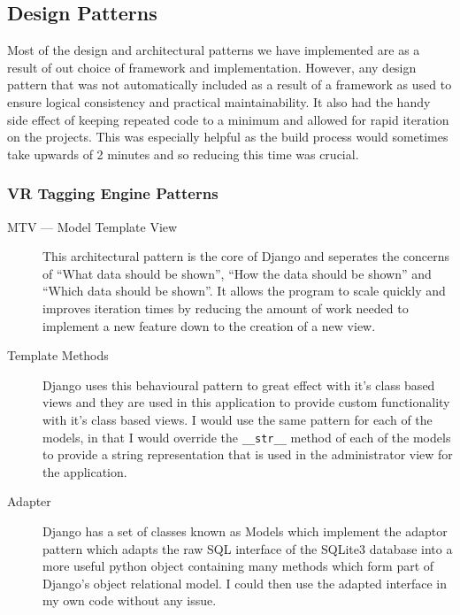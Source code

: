 \documentclass[12pt]{report}
\newcommand{\inlinecode}{\texttt}
\begin{document}
\subsection{Design Patterns}

Most of the design and architectural patterns we have implemented are as a
result of out choice of framework and implementation. However, any design
pattern that was not automatically included as a result of a framework as used
to ensure logical consistency and practical maintainability. It also had the
handy side effect of keeping repeated code to a minimum and allowed for rapid
iteration on the projects. This was especially helpful as the build process
would sometimes take upwards of 2 minutes and so reducing this time was crucial.

\subsubsection{VR Tagging Engine Patterns}
\begin{description}
    \item [MTV --- Model Template View] This architectural pattern is the core
        of Django and seperates the concerns of ``What data should be shown'',
        ``How the data should be shown'' and ``Which data should be shown''. It
        allows the program to scale quickly and improves iteration times by
        reducing the amount of work needed to implement a new feature down to
        the creation of a new view.

    \item [Template Methods] Django uses this behavioural pattern to great
        effect with it's class based views and they are used in this
        application to provide custom functionality with it's class based
        views. I would use the same pattern for each of the models, in that I would
        override the \inlinecode{\_\_str\_\_} method of each of the models to
        provide a string representation that is used in the administrator view
        for the application.

    \item [Adapter] Django has a set of classes known as Models which implement
        the adaptor pattern which adapts the raw SQL interface of the SQLite3
        database into a more useful python object containing many methods which
        form part of Django's object relational model. I could then use the
        adapted interface in my own code without any issue.
\end{description}
\end{document}
